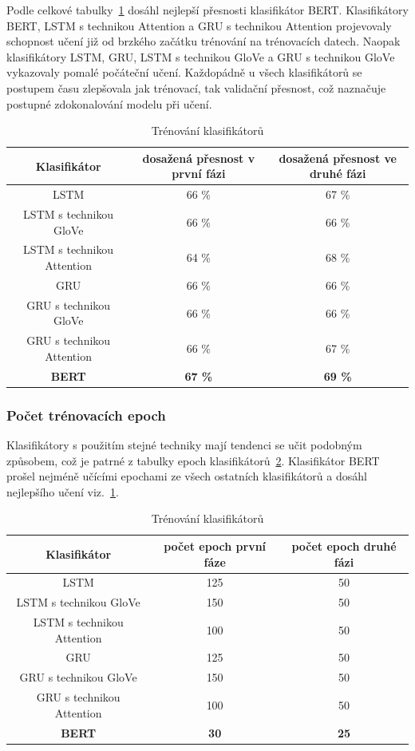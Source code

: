 Podle celkové tabulky~\ref{tab:EN trenovani klasifikatoru} dosáhl nejlepší přesnosti klasifikátor BERT.\@
Klasifikátory BERT, LSTM s technikou Attention a GRU s technikou Attention projevovaly schopnost učení již od brzkého začátku trénování na trénovacích datech.
Naopak klasifikátory LSTM, GRU, LSTM s technikou GloVe a GRU s technikou GloVe vykazovaly pomalé počáteční učení.
Každopádně u všech klasifikátorů se postupem času zlepšovala jak trénovací, tak validační přesnost, což naznačuje postupné zdokonalování modelu při učení.
\begin{table}[H]
	\centering
	\caption{Trénování klasifikátorů}\label{tab:EN trenovani klasifikatoru}
	\begin{tabular}{ c c c }
			\toprule
			Klasifikátor & dosažená přesnost v první fázi & dosažená přesnost ve druhé fázi\\
			\midrule
            LSTM & 66 \% & 67 \%\\
            LSTM s technikou GloVe & 66 \% & 66 \%\\
            LSTM s technikou Attention & 64 \% & 68 \%\\
            GRU & 66 \% & 66 \%\\
            GRU s technikou GloVe & 66 \% & 66 \%\\
            GRU s technikou Attention & 66 \% & 67 \%\\
            \textbf{BERT} & \textbf{67 \%} & \textbf{69 \%}\\
			\midrule
		\end{tabular}
\end{table}

\subsubsection{Počet trénovacích epoch}
Klasifikátory s použitím stejné techniky mají tendenci se učit podobným způsobem, což je patrné z tabulky epoch klasifikátorů~\ref{tab:EN pocet epoch}.
Klasifikátor BERT prošel nejméně učícími epochami ze všech ostatních klasifikátorů a dosáhl nejlepšího učení viz.~\ref{tab:EN trenovani klasifikatoru}.

\begin{table}[H]
	\centering
	\caption{Trénování klasifikátorů}\label{tab:EN pocet epoch}
	\begin{tabular}{ c c c }
			\toprule
			Klasifikátor & počet epoch první fáze & počet epoch druhé fázi\\
			\midrule
            LSTM & 125 & 50\\
            LSTM s technikou GloVe & 150 & 50\\
            LSTM s technikou Attention & 100 & 50\\
            GRU & 125 & 50\\
            GRU s technikou GloVe & 150 & 50\\
            GRU s technikou Attention & 100 & 50\\
            \textbf{BERT} & \textbf{30} & \textbf{25}\\
			\midrule
		\end{tabular}
\end{table}

